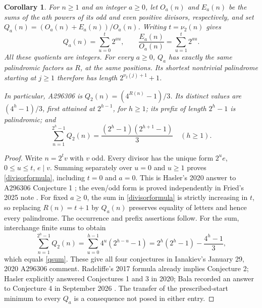 \documentclass[11pt]{article}
\newtheorem{corollary}[theorem]{Corollary}
\newcommand{\vv}{\nu_2}
\begin{document}
\begin{corollary}\label{divisors}
For $n\ge1$ and an integer $a\ge0$, let $O_a(n)$ and $E_a(n)$ be
the sums of the $a$th powers of its odd and even positive divisors,
respectively, and set $Q_a(n)=(O_a(n)+E_a(n))/O_a(n)$.
Writing $t=\vv(n)$ gives
\begin{equation}\label{divisorformula}
 Q_a(n)=\sum_{u=0}^t2^{au},\qquad
 \frac{E_a(n)}{O_a(n)}=\sum_{u=1}^t2^{au}.
\end{equation}
All these quotients are integers. For every $a\ge0$, $Q_a$ has
exactly the same palindromic factors as $R$, at the same positions.
Its shortest nontrivial palindrome starting at $j\ge1$ therefore
has length $2^{\vv(j)+1}+1$.

In particular, A296306 is $Q_2(n)=(4^{R(n)}-1)/3$.
Its distinct values are $(4^h-1)/3$, first attained at $2^{h-1}$,
for $h\ge1$; its prefix of length $2^h-1$ is palindromic; and
\begin{equation}\label{qsum}
 \sum_{n=1}^{2^h-1} Q_2(n)
 =\frac{(2^h-1)(2^{h+1}-1)}{3}\quad(h\ge1).
\end{equation}
\end{corollary}
\begin{proof}
Write $n=2^t v$ with $v$ odd. Every divisor has the unique form
$2^u e$, $0\le u\le t$, $e\mid v$. Summing separately over
$u=0$ and $u\ge1$ proves \eqref{divisorformula}, including $t=0$
and $a=0$. This is Hasler's 2020 answer to A296306 Conjecture 1
\cite{oeisQ}; the even/odd form is proved independently in Fried's
2025 note \cite{fried}. For fixed $a\ge0$, the sum in
\eqref{divisorformula} is strictly increasing in $t$, so replacing
$R(n)=t+1$ by $Q_a(n)$ preserves equality of letters and hence
every palindrome. The occurrence and prefix assertions follow.
For the sum, interchange finite sums to obtain
\[
 \sum_{n=1}^{2^h-1}Q_2(n)
 =\sum_{u=0}^{h-1}4^u(2^{h-u}-1)
 =2^h(2^h-1)-\frac{4^h-1}{3},
\]
which equals \eqref{qsum}. These give all four conjectures in
Ianakiev's January 29, 2020 A296306 comment. Radcliffe's 2017
formula already implies Conjecture 2; Hasler explicitly answered
Conjectures 1 and 3 in 2020; Bala recorded an answer to
Conjecture 4 in September 2026 \cite{oeisQ}. The transfer of the
prescribed-start minimum to every $Q_a$ is a consequence not posed
in either entry.
\end{proof}
\end{document}
